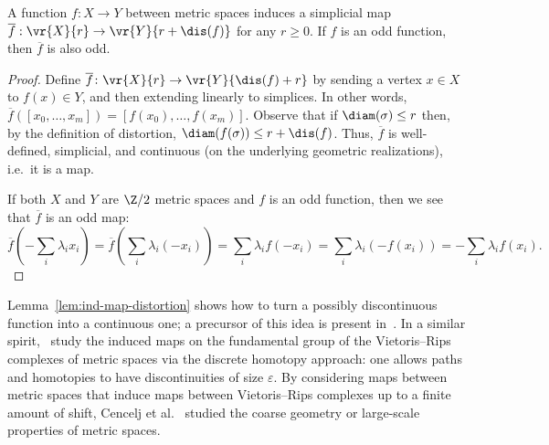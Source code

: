 \documentclass[11pt, reqno, english]{amsart}
\begin{document}
\begin{lemma}\label{lem:ind-map-distortion}
A function $f\colon X \to Y$ between metric spaces induces a simplicial map $\overline{f}:\vr{X}{r}\to\vr{Y}{r+\dis(f)}$ for any $r\ge0$.
If $f$ is an odd function, then $\overline{f}$ is also odd.
\end{lemma}
    
\begin{proof}
Define $\overline{f}\colon \vr{X}{r}\to\vr{Y}{\dis(f)+r}$ by sending a vertex $x\in X$ to $f(x)\in Y$, and then extending linearly to simplices.
In other words, $\overline{f}([x_0,\ldots,x_m])=[f(x_0),\ldots,f(x_m)]$.
Observe that if $\diam(\sigma) \le r$ then, by the definition of distortion, $\diam(f(\sigma)) \le r+\dis(f)$.
Thus, $\overline{f}$ is well-defined, simplicial, and continuous (on the underlying geometric realizations), i.e.\ it is a map.
    
If both $X$ and $Y$ are $\Z/2$ metric spaces and $f$ is an odd function, then we see that $\overline{f}$ is an odd map:
\begin{equation}
\label{eq:f-odd}
\textstyle{ \overline{f}\left(-\sum_i\lambda_i x_i\right) = \overline{f}\left(\sum_i\lambda_i (-x_i)\right)=\sum_i\lambda_i f(-x_i)=\sum_i\lambda_i (-f(x_i))=-\sum_i\lambda_i f(x_i).
}
\end{equation}
\end{proof}

Lemma~\ref{lem:ind-map-distortion} shows how to turn a possibly discontinuous function into a continuous one; a precursor of this idea is present in~\cite{dubins1981equidiscontinuity}.
In a similar spirit,~\cite{berestovskii2007uniform,brodskiy2013rips,plaut2013discrete,rieser2021cech} study the induced maps on the fundamental group of the Vietoris--Rips complexes of metric spaces via the discrete homotopy approach: one allows paths and homotopies to have discontinuities of size $\varepsilon$.
By considering maps between metric spaces that induce maps between Vietoris--Rips complexes up to a finite amount of shift, Cencelj et al.~\cite{cencelj2012combinatorial} studied the coarse geometry or large-scale properties of metric spaces.
\end{document}
